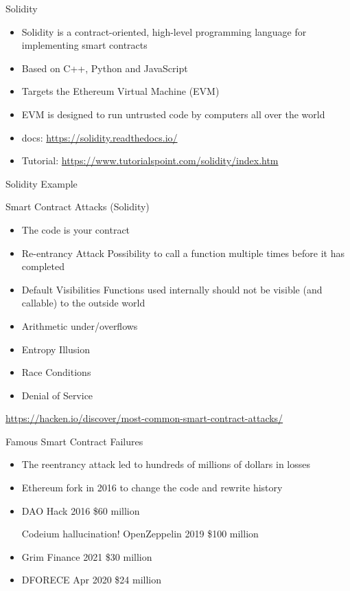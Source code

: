 \begin{withoutheadline}
\begin{frame}{Solidity}
    \begin{itemize}
        \item Solidity is a contract-oriented, high-level programming language for implementing smart contracts
        \item Based on C++, Python and JavaScript
        \item Targets the Ethereum Virtual Machine (EVM)
        \item EVM is designed to run untrusted code by computers all over the world
        \item docs: \url{https://solidity.readthedocs.io/}
        \item Tutorial: \url{https://www.tutorialspoint.com/solidity/index.htm}
    \end{itemize}
\end{frame}

\begin{frame}{Solidity Example}

\end{frame}


\begin{frame}{Smart Contract Attacks (Solidity)}
    \begin{itemize}
        \item The code is your contract
        \item Re-entrancy Attack
              Possibility to call a function multiple times before it has completed
        \item Default Visibilities
              Functions used internally should not be visible (and callable) to the outside world
        \item Arithmetic under/overflows
        \item Entropy Illusion
        \item Race Conditions
        \item Denial of Service
    \end{itemize}
    \url{https://hacken.io/discover/most-common-smart-contract-attacks/}
\end{frame}

\begin{frame}{Famous Smart Contract Failures}
    \begin{itemize}
        \item The reentrancy attack led to hundreds of millions of dollars in losses
        \item Ethereum fork in 2016 to change the code and rewrite history
        \item DAO Hack 2016 \$60 million
        \item [Codeium hallucination!] OpenZeppelin 2019 \$100 million 
        \item Grim Finance 2021 \$30 million
        \item DFORECE Apr 2020 \$24 million
    \end{itemize}
\end{frame}


\end{withoutheadline}
